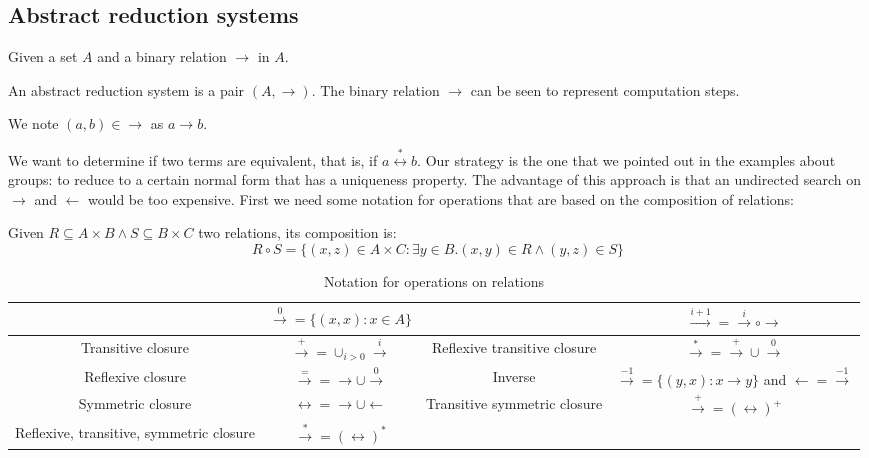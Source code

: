 \subsection{Abstract reduction systems}

\begin{definition}
Given a set $A$ and a binary relation $\to$ in $A$.

An abstract reduction system is a pair $(A,\to)$. The binary relation $\to$ can be seen to represent computation steps. 

We note $(a,b) \in \to$ as $a \to b$. 
\end{definition}

We want to determine if two terms are equivalent, that is, if $a \stackrel{*}{\leftrightarrow} b$. Our strategy is the one that we pointed out in the examples about groups: to reduce to a certain normal form that has a uniqueness property. The advantage of this approach is that an undirected search on $\to$ and $\gets$ would be too expensive. First we need some notation for operations that are based on the composition of relations: 

Given $R \subseteq A \times B \land S \subseteq B \times C$ two relations, its composition is: $$R \circ S = \{(x,z) \in A \times C: \exists y \in B. (x,y) \in R \land (y,z) \in S\}$$

\begin{table}[H]
\centering
\begin{adjustwidth}{-2cm}{}
\begin{tabular}{|| c | c | c | c ||}
\hline
\hline & $\stackrel{0}{\rightarrow} = \{(x,x):x \in A \}$ & & $\stackrel{i+1}{\rightarrow} = \stackrel{i}{\rightarrow} \circ \to$ \\
\hline Transitive closure & $\stackrel{+}{\rightarrow} = \cup_{i > 0} \stackrel{i}{\rightarrow}$ & Reflexive transitive closure & $\stackrel{*}{\rightarrow} = \stackrel{+}{\rightarrow} \cup \stackrel{0}{\rightarrow}$ \\
\hline  Reflexive closure & $\stackrel{=}{\rightarrow} = \to \cup \stackrel{0}{\rightarrow}$ & Inverse & $\stackrel{-1}{\rightarrow} = \{(y,x):x \to y\}$ and $\leftarrow= \stackrel{-1}{\rightarrow}$ \\
\hline  Symmetric closure & $\leftrightarrow = \to \cup \leftarrow$ & Transitive symmetric closure & $\stackrel{+}{\rightarrow} = (\leftrightarrow)^+$ \\
\hline Reflexive, transitive, symmetric closure &  $\stackrel{*}{\rightarrow} = (\leftrightarrow)^*$ & & \\
\hline
\end{tabular}
\end{adjustwidth}
\caption{Notation for operations on relations}
\label{table:notation1}
\end{table}

